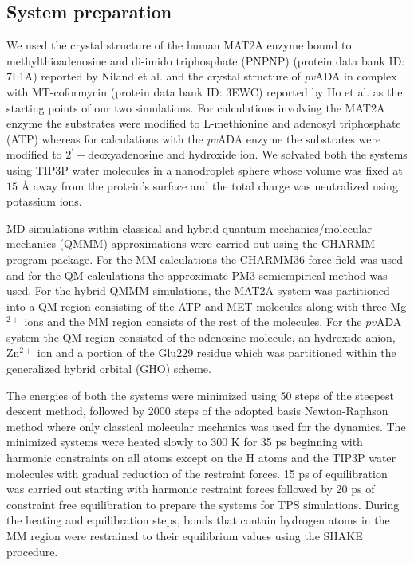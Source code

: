 \documentclass[journal=jpcbfk,manuscript=article,layout=traditional]{achemso}
\begin{document}
\subsection{System preparation}
We used the crystal structure of the human MAT2A enzyme 
bound to methylthioadenosine and di-imido triphosphate (PNPNP)
(protein data bank ID: 7L1A) reported by Niland 
et al. \cite{Niland21Biochem60p791,Ghosh21JAmChemSoc143p18325} and the crystal 
structure of \textit{pv}ADA in complex with MT-coformycin (protein data bank ID: 3EWC) 
reported by Ho et al. \cite{Ho09Biochemistry48p9618} as the starting points of our two 
simulations. For calculations involving the MAT2A enzyme the substrates were modified to 
L-methionine and adenosyl triphosphate (ATP) whereas for calculations with the \textit{pv}ADA
enzyme the substrates were modified to $2^{'}-$deoxyadenosine and hydroxide ion. 
We solvated both the systems using TIP3P water molecules \cite{Jorgensen83JChemPhys79p926}
in a nanodroplet sphere whose volume was fixed at $15$ {\AA}
away from the protein's surface and the total charge was neutralized 
using potassium ions. 

MD simulations within classical and hybrid quantum mechanics/molecular mechanics 
(QMMM) approximations were carried out using the CHARMM program 
package. \cite{Brooks83JComputChem4p187} 
For the MM calculations the CHARMM36 force field \cite{Brooks09JComputChem30p1545} 
was used and for the QM calculations the approximate PM3 semiempirical 
method \cite{Repasky02JComputChem23p1601} was used. 
For the hybrid QMMM simulations, the MAT2A system was partitioned into a QM
region consisting of the ATP and MET molecules along with three Mg$^{2+}$ ions 
and the MM region consists of the rest of the molecules. 
For the $pv$ADA system the QM region consisted of 
the adenosine molecule, an hydroxide anion, Zn$^{2+}$ ion and 
a portion of the Glu229 residue which was partitioned within the generalized 
hybrid orbital (GHO) scheme. \cite{Gao98JPhysChemA102p4714}  

The energies of both the systems were minimized using 50 steps of the 
steepest descent method, followed by 2000 steps of the
adopted basis Newton-Raphson method where only classical molecular mechanics 
was used for the dynamics. 
The minimized systems were
heated slowly to 300 K for 35 ps beginning with harmonic
constraints on all atoms except on the H atoms and the TIP3P 
water molecules with gradual reduction of the restraint forces. 
15 ps of equilibration was carried out starting with harmonic 
restraint forces followed by 20 ps of constraint free 
equilibration to prepare the systems for TPS simulations. 
During the heating and equilibration steps, bonds that contain 
hydrogen atoms in the MM region were restrained to their equilibrium values 
using the SHAKE procedure. \cite{Ryckaert77JComputPhys23p327} 
\end{document}
